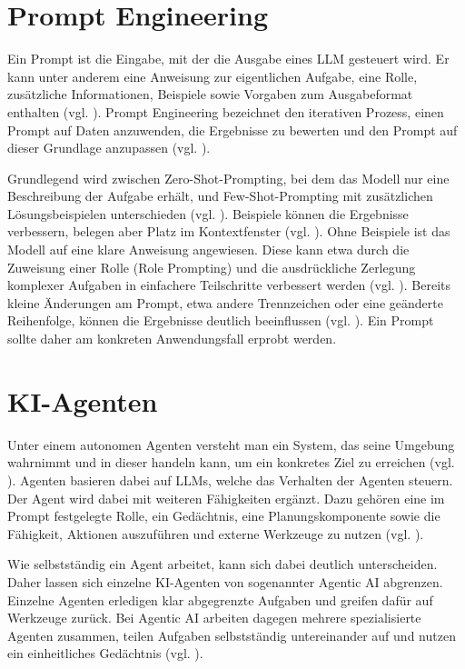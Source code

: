 \section{Prompt Engineering}
\label{sec:promptengineering}

Ein Prompt ist die Eingabe, mit der die Ausgabe eines \ac{LLM} gesteuert wird. Er kann unter anderem eine Anweisung zur eigentlichen Aufgabe, eine Rolle, zusätzliche Informationen, Beispiele sowie Vorgaben zum Ausgabeformat enthalten (vgl. \cite[S.~5~f.]{schulhoff2025promptreportsystematicsurvey}). Prompt Engineering bezeichnet den iterativen Prozess, einen Prompt auf Daten anzuwenden, die Ergebnisse zu bewerten und den Prompt auf dieser Grundlage anzupassen (vgl. \cite[S.~7]{schulhoff2025promptreportsystematicsurvey}).

Grundlegend wird zwischen Zero-Shot-Prompting, bei dem das Modell nur eine Beschreibung der Aufgabe erhält, und Few-Shot-Prompting mit zusätzlichen Lösungsbeispielen unterschieden (vgl. \cite[S.~1879]{brown2020language}). Beispiele können die Ergebnisse verbessern, belegen aber Platz im Kontextfenster (vgl. \cite[S.~10~f.]{schulhoff2025promptreportsystematicsurvey}). Ohne Beispiele ist das Modell auf eine klare Anweisung angewiesen. Diese kann etwa durch die Zuweisung einer Rolle (Role Prompting) und die ausdrückliche Zerlegung komplexer Aufgaben in einfachere Teilschritte verbessert werden (vgl. \cite[S.~11, 13]{schulhoff2025promptreportsystematicsurvey}). Bereits kleine Änderungen am Prompt, etwa andere Trennzeichen oder eine geänderte Reihenfolge, können die Ergebnisse deutlich beeinflussen (vgl. \cite[S.~31]{schulhoff2025promptreportsystematicsurvey}). Ein Prompt sollte daher am konkreten Anwendungsfall erprobt werden.

\section{KI-Agenten}

Unter einem autonomen Agenten versteht man ein System, das seine Umgebung wahrnimmt und in dieser handeln kann, um ein konkretes Ziel zu erreichen (vgl. \cite[S. 1]{wang2024survey}). Agenten basieren dabei auf \acp{LLM}, welche das Verhalten der Agenten steuern. Der Agent wird dabei mit weiteren Fähigkeiten ergänzt. Dazu gehören eine im Prompt festgelegte Rolle, ein Gedächtnis, eine Planungskomponente sowie die Fähigkeit, Aktionen auszuführen und externe Werkzeuge zu nutzen (vgl. \cite[S. 6]{wang2024survey}).

Wie selbstständig ein Agent arbeitet, kann sich dabei deutlich unterscheiden. Daher lassen sich einzelne \ac{KI}-Agenten von sogenannter Agentic AI abgrenzen. Einzelne Agenten erledigen klar abgegrenzte Aufgaben und greifen dafür auf Werkzeuge zurück. Bei Agentic AI arbeiten dagegen mehrere spezialisierte Agenten zusammen, teilen Aufgaben selbstständig untereinander auf und nutzen ein einheitliches Gedächtnis (vgl. \cite[S. 5 f.]{sapkota2026agenticai}).

